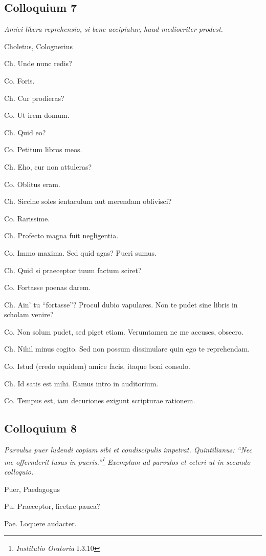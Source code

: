 \documentclass{article}
\begin{document}
\subsection{Colloquium 7}
\emph{Amici libera reprehensio, si bene accipiatur, haud mediocriter prodest.}

Choletus, Colognerius

Ch. Unde nunc redis?

Co. Foris.

Ch. Cur prodieras?

Co. Ut irem domum.

Ch. Quid eo?

Co. Petitum libros meos.

Ch. Eho, cur non attuleras?

Co. Oblitus eram.

Ch. Siccine soles ientaculum aut merendam oblivisci?

Co. Rarissime.

Ch. Profecto magna fuit negligentia.

Co. Immo maxima. Sed quid agas? Pueri sumus.

Ch. Quid si praeceptor tuum factum sciret?

Co. Fortasse poenas darem.

Ch. Ain' tu ``fortasse''? Procul dubio vapulares. Non te pudet sine libris in scholam venire?

Co. Non solum pudet, sed piget etiam. Verumtamen ne me accuses, obsecro.

Ch. Nihil minus cogito. Sed non possum dissimulare quin ego te reprehendam.

Co. Istud (credo equidem) amice facis, itaque boni consulo.

Ch. Id satis est mihi. Eamus intro in auditorium.

Co. Tempus est, iam decuriones exigunt scripturae rationem.

\subsection{Colloquium 8}
\emph{Parvulus puer ludendi copiam sibi et condiscipulis impetrat. Quintilianus: ``Nec me offernderit lusus in pueris.''\footnote{\emph{Institutio Oratoria} I.3.10} Exemplum ad parvulos et ceteri ut in secundo colloquio.}

Puer, Paedagogus

Pu. Praeceptor, licetne pauca?

Pae. Loquere audacter.
\end{document}

